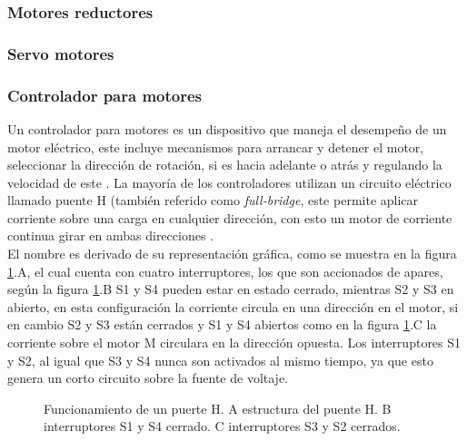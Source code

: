 \documentclass{iccmemoria}
\begin{document}
\subsubsection{Motores reductores}

\subsubsection{Servo motores}

\subsubsection{Controlador para motores}

Un controlador para motores es un dispositivo que maneja el desempeño de un motor eléctrico, este incluye mecanismos para arrancar y detener el motor, seleccionar la dirección de rotación, si es hacia adelante o atrás y regulando la velocidad de este \cite{siskind1963electrical}. La mayoría de los controladores utilizan un circuito eléctrico llamado puente H (también referido como \emph{full-bridge}, este permite aplicar corriente sobre una carga en cualquier dirección, con esto un motor de corriente continua girar en ambas direcciones \cite{williams2002microcontroller}.\\

El nombre es derivado de su representación gráfica, como se muestra en la figura \ref{fig:H bridge}.A, el cual cuenta con cuatro interruptores, los que son accionados de apares, según la figura \ref{fig:H bridge}.B S1 y S4 pueden estar en estado cerrado, mientras S2 y S3 en abierto, en esta configuración la corriente circula en una dirección en el motor, si en cambio S2 y S3 están cerrados y S1 y S4 abiertos como en la figura \ref{fig:H bridge}.C la corriente sobre el motor M circulara en la dirección opuesta. Los interruptores S1 y S2, al igual que S3 y S4 nunca son activados al mismo tiempo, ya que esto genera un corto circuito sobre la fuente de voltaje.\\

\begin{figure}[H]
  \centering
  
  \caption{Funcionamiento de un puerte H. A estructura del puente H. B interruptores S1 y S4 cerrado. C interruptores S3 y S2 cerrados.}
  \label{fig:H bridge}
\end{figure}
\end{document}

